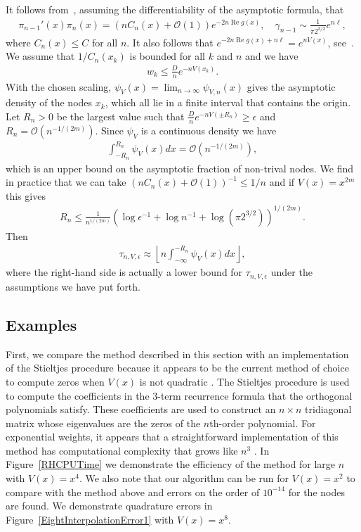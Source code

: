 \documentclass[final]{siamltex}
\begin{document}
It follows from~\cite[(7.187), (7.84)]{Deift_Book}, assuming the differentiability of the asymptotic formula, that
\begin{align*}
\pi_{n-1}'(x) \pi_{n}(x) = (n C_n(x) + {\mathcal O}(1)) e^{-2 n \operatorname{Re} g(x)}, \quad \gamma_{n-1} \sim \frac{1}{\pi 2^{3/2}} e^{n\ell},
\end{align*}
where $C_n(x) \leq C$ for all $n$.  It also follows that $e^{-2 n \operatorname{Re} g(x)+n \ell} = e^{nV(x)}$, see~\cite[(7.49)]{Deift_Book}.  We assume that $1/C_n(x_{k})$ is bounded for all $k$ and $n$ and we have
\begin{align*}
w_k \leq \frac{D}{n} e^{-n V(x_{k})}.
\end{align*}
With the chosen scaling, $\psi_{V}(x) = \lim_{n \rightarrow \infty} \psi_{V,n}(x)$ gives the asymptotic density of the nodes $x_{k}$, which all lie in a finite interval that contains the origin.  Let $R_n>0$ be the largest value such that $\frac{D}{n} e^{-n V(\pm R_n)} \geq \epsilon$ and $R_n = {\mathcal O}(n^{-1/(2m)})$. Since $\psi_V$ is a continuous density we have
\begin{align*}
{\int_{-R_n}^{R_n} \psi_V(x) dx} = {\mathcal O}(n^{-1/(2m)}),
\end{align*}
which is an upper bound on the asymptotic fraction of non-trival nodes.  We find in practice that we can take $(n C_n(x) + {\mathcal O}(1))^{-1} \leq 1/n$ and if $V(x) = x^{2m}$ this gives
\begin{align*}
R_n \leq \frac{1}{n^{1/(2m)}} \left( \log{\epsilon^{-1}} + \log n^{-1} + \log (\pi 2^{3/2}) \right)^{1/(2m)}.
\end{align*}
Then
\begin{align*}
\tau_{n,V,\epsilon} \approx \left\lfloor n \int_{-\infty}^{-R_n} \psi_V(x) dx \right\rfloor,
\end{align*}
where the right-hand side is actually a lower bound for $\tau_{n,V,\epsilon}$ under the assumptions we have put forth.

\subsection{Examples}

First, we compare the method described in this section with an implementation of the Stieltjes procedure because it appears to be the current method of choice to compute zeros when $V(x)$ is not quadratic \cite{Gautschi}.  The Stieltjes procedure is used to compute the coefficients in the $3$-term recurrence formula that the orthogonal polynomials satisfy.  These coefficients are used to construct an $n\times n$ tridiagonal matrix whose eigenvalues are the zeros of the $n$th-order polynomial.  For exponential weights, it appears that a straightforward implementation of this method has computational complexity that grows like $n^3$ \cite{TrogdonSOGaussQuad}.  In Figure~\ref{RHCPUTime} we demonstrate the efficiency of the method for large $n$ with $V(x) = x^4$.  We also note that our algorithm can be run for $V(x)=x^2$ to compare with the method above and errors on the order of $10^{-14}$ for the nodes are found.  We demonstrate quadrature errors in Figure~\ref{EightInterpolationError1} with $V(x) = x^8$.
\end{document}
